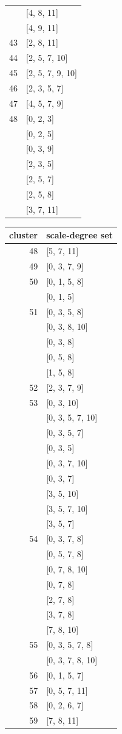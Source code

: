 \begin{table}
\begin{multicols}{3}
{\begin{tabular}[t]{r|l}
	&	[4, 8, 11]	\\
	&	[4, 9, 11]	\\
43	&	[2, 8, 11]	\\
44	&	[2, 5, 7, 10]	\\
45	&	[2, 5, 7, 9, 10]	\\
46	&	[2, 3, 5, 7]	\\
47	&	[4, 5, 7, 9]	\\
48	&	[0, 2, 3]	\\
	&	[0, 2, 5]	\\
	&	[0, 3, 9]	\\
	&	[2, 3, 5]	\\
	&	[2, 5, 7]	\\
	&	[2, 5, 8]	\\
	&	[3, 7, 11]	\\
\end{tabular}
\vfill
\columnbreak
\begin{tabular}[t]{r |l }
\hline\hline
cluster & scale-degree set\\ [0.5ex]
\hline
48	&	[5, 7, 11]	\\
49	&	[0, 3, 7, 9]	\\
50	&	[0, 1, 5, 8]	\\
	&	[0, 1, 5]	\\
51	&	[0, 3, 5, 8]	\\
	&	[0, 3, 8, 10]	\\
	&	[0, 3, 8]	\\
	&	[0, 5, 8]	\\
	&	[1, 5, 8]	\\
52	&	[2, 3, 7, 9]	\\
53	&	[0, 3, 10]	\\
	&	[0, 3, 5, 7, 10]	\\
	&	[0, 3, 5, 7]	\\
	&	[0, 3, 5]	\\
	&	[0, 3, 7, 10]	\\
	&	[0, 3, 7]	\\
	&	[3, 5, 10]	\\
	&	[3, 5, 7, 10]	\\
	&	[3, 5, 7]	\\
54	&	[0, 3, 7, 8]	\\
	&	[0, 5, 7, 8]	\\
	&	[0, 7, 8, 10]	\\
	&	[0, 7, 8]	\\
	&	[2, 7, 8]	\\
	&	[3, 7, 8]	\\
	&	[7, 8, 10]	\\
55	&	[0, 3, 5, 7, 8]	\\
	&	[0, 3, 7, 8, 10]	\\
56	&	[0, 1, 5, 7]	\\
57	&	[0, 5, 7, 11]	\\
58	&	[0, 2, 6, 7]	\\
59	&	[7, 8, 11]	\\
\end{tabular}
}
\vfill
\columnbreak
\vfill
\end{multicols}
\end{table}

